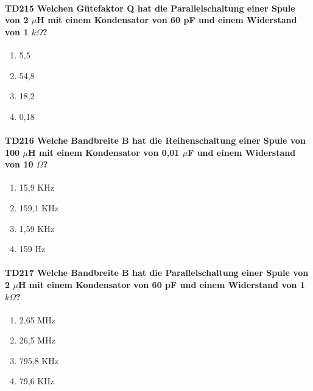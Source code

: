 \documentclass[8pt]{article}
\begin{document}
\begin{enumerate}
\begin{enumerate}[nolistsep,label=\Alph*]
{\paragraph*{TD215 Welchen Gütefaktor Q hat die Parallelschaltung einer Spule von 2 $\mu$H mit einem Kondensator von 60 pF und einem Widerstand von 1 $k\Omega$?}
\begin{enumerate}[nolistsep,label=\Alph*]
\item 5,5
\item 54,8
\item 18,2
\item 0,18
\end{enumerate}

\paragraph*{TD216 Welche Bandbreite B hat die Reihenschaltung einer Spule von 100 $\mu$H mit einem Kondensator von 0,01 $\mu$F und einem Widerstand von 10 $\Omega$?}
\begin{enumerate}[nolistsep,label=\Alph*]
\item 15,9 KHz
\item 159,1 KHz
\item 1,59 KHz
\item 159 Hz
\end{enumerate}

\paragraph*{TD217 Welche Bandbreite B hat die Parallelschaltung einer Spule von 2 $\mu$H mit einem Kondensator von 60 pF und einem Widerstand von 1 $k\Omega$?}
\begin{enumerate}[nolistsep,label=\Alph*]
\item 2,65 MHz
\item 26,5 MHz
\item 795,8 KHz
\item 79,6 KHz
\end{enumerate}

}
\end{enumerate}
\end{enumerate}
\end{document}
